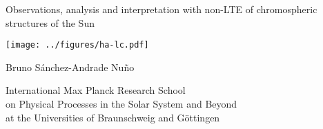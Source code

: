 \documentclass{article}
\begin{document}
\pagestyle{empty}


\null\vspace{-5cm}

\hspace*{-1.2cm}\colorbox{bcol}{\parbox[b][22cm][c]{15.2cm}{\null\hfill}}

\vspace{-19.4cm}

\hspace*{5mm}\begin{minipage}[t][17.5cm]{12cm}

\begin{center}

\fontsize{19}{21}\selectfont

\textcolor{tcol}{Observations, analysis and interpretation with non-LTE of chromospheric structures of the Sun}

\vspace{1.8cm}


\texttt{[image: ../figures/ha-lc.pdf]}%


\vspace{1.5cm}

\textcolor{acol}{Bruno S\'anchez-Andrade Nu\~no}

\vfill

\fontsize{12}{15}\selectfont


\textcolor{scol}{International Max Planck Research School\\
on Physical Processes in the Solar System and Beyond\\
at the Universities of Braunschweig and G\"ottingen}

\end{center}

\end{minipage}
\end{document}
